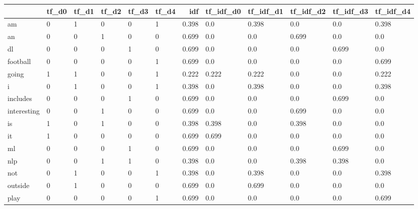 \begin{tabular}{llllllrlllll}
\toprule
{} & tf\_d0 & tf\_d1 & tf\_d2 & tf\_d3 & tf\_d4 &    idf & tf\_idf\_d0 & tf\_idf\_d1 & tf\_idf\_d2 & tf\_idf\_d3 & tf\_idf\_d4 \\
\midrule
am          &     0 &     1 &     0 &     0 &     1 &  0.398 &       0.0 &     0.398 &       0.0 &       0.0 &     0.398 \\
an          &     0 &     0 &     1 &     0 &     0 &  0.699 &       0.0 &       0.0 &     0.699 &       0.0 &       0.0 \\
dl          &     0 &     0 &     0 &     1 &     0 &  0.699 &       0.0 &       0.0 &       0.0 &     0.699 &       0.0 \\
football    &     0 &     0 &     0 &     0 &     1 &  0.699 &       0.0 &       0.0 &       0.0 &       0.0 &     0.699 \\
going       &     1 &     1 &     0 &     0 &     1 &  0.222 &     0.222 &     0.222 &       0.0 &       0.0 &     0.222 \\
i           &     0 &     1 &     0 &     0 &     1 &  0.398 &       0.0 &     0.398 &       0.0 &       0.0 &     0.398 \\
includes    &     0 &     0 &     0 &     1 &     0 &  0.699 &       0.0 &       0.0 &       0.0 &     0.699 &       0.0 \\
interesting &     0 &     0 &     1 &     0 &     0 &  0.699 &       0.0 &       0.0 &     0.699 &       0.0 &       0.0 \\
is          &     1 &     0 &     1 &     0 &     0 &  0.398 &     0.398 &       0.0 &     0.398 &       0.0 &       0.0 \\
it          &     1 &     0 &     0 &     0 &     0 &  0.699 &     0.699 &       0.0 &       0.0 &       0.0 &       0.0 \\
ml          &     0 &     0 &     0 &     1 &     0 &  0.699 &       0.0 &       0.0 &       0.0 &     0.699 &       0.0 \\
nlp         &     0 &     0 &     1 &     1 &     0 &  0.398 &       0.0 &       0.0 &     0.398 &     0.398 &       0.0 \\
not         &     0 &     1 &     0 &     0 &     1 &  0.398 &       0.0 &     0.398 &       0.0 &       0.0 &     0.398 \\
outside     &     0 &     1 &     0 &     0 &     0 &  0.699 &       0.0 &     0.699 &       0.0 &       0.0 &       0.0 \\
play        &     0 &     0 &     0 &     0 &     1 &  0.699 &       0.0 &       0.0 &       0.0 &       0.0 &     0.699 \\

\end{tabular}
